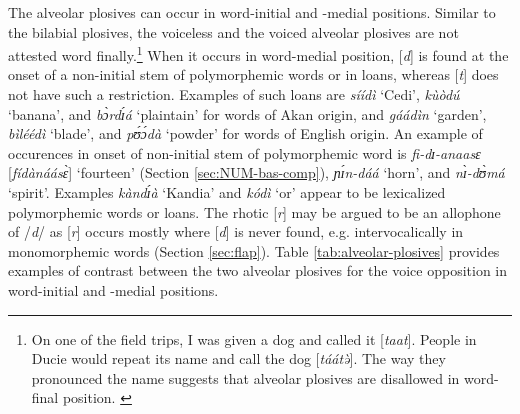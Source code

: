 The alveolar plosives can occur in word-initial and  -medial positions. Similar
to the bilabial plosives, the voiceless and the voiced alveolar plosives  are
not attested word finally.\footnote{On one of the field trips, I was given a dog
and  called it [{\it taat}]. People in Ducie would repeat its name and call the 
dog
[{\it táátə̀}]. The way they pronounced the name suggests that alveolar 
plosives are disallowed in word-final position. \label{fn:taat-epenthesis}}  
When it occurs in word-medial position,  [{\it  d}] is found  at the onset of a 
non-initial stem of polymorphemic words or in loans, whereas [{\it t}] does not 
have such a restriction. Examples of such loans are  \textit{síídì} `Cedi', 
\textit{kùòdú} `banana', and \textit{bɔ̀rdɪ́á} `plaintain'  for words of Akan 
origin, and  \textit{gáádìn} `garden', \textit{bìléédì} `blade',  and 
\textit{﻿pʊ́ɔ́dà} `powder' for words of English origin. An example of occurences 
in onset of non-initial stem of polymorphemic word is \textit{fi-dɪ-anaasɛ} 
[\textit{fídànáásɛ̀}] `fourteen' (Section \ref{sec:NUM-bas-comp}),   
\textit{ɲɪ́n-dáá}	`horn', and \textit{nɪ̀-dʊ̀má}  `spirit'.  Examples 
\textit{kàndɪ́à} `Kandia'  and \textit{kódì} `or' appear to be lexicalized 
polymorphemic words or loans. The rhotic [{\it r}] may be argued to be an 
allophone of /{\it d}/ as   [{\it  r}] occurs mostly where [{\it d}] is never 
found, e.g. intervocalically in monomorphemic words (Section \ref{sec:flap}). 
Table \ref{tab:alveolar-plosives} provides examples of contrast between the two 
alveolar plosives for the {\sc voice} opposition in word-initial and  -medial 
positions.


